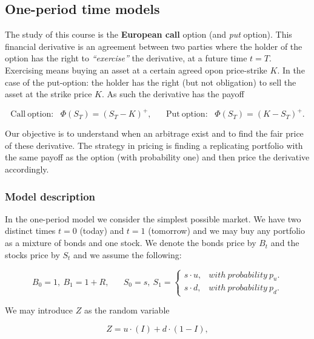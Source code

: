 \documentclass[
]{book}
\begin{document}
\hypertarget{one-period-time-models}{%
\subsection{One-period time models}\label{one-period-time-models}}

The study of this course is the \textbf{European call} option (and \emph{put} option). This financial derivative is an agreement between two parties where the holder of the option has the right to \emph{``exercise''} the derivative, at a future time \(t=T\). Exercising means buying an asset at a certain agreed opon price-strike \(K\). In the case of the put-option: the holder has the right (but not obligation) to sell the asset at the strike price \(K\). As such the derivative has the payoff

\[\text{Call}\ \text{option:}\hspace{10pt}\Phi(S_T)=(S_T-K)^+,\hspace{20pt}\text{Put}\ \text{option:}\hspace{10pt}\Phi(S_T)=(K-S_T)^+.\]

Our objective is to understand when an arbitrage exist and to find the fair price of these derivative. The strategy in pricing is finding a replicating portfolio with the same payoff as the option (with probability one) and then price the derivative accordingly.

\hypertarget{model-description}{%
\subsubsection{Model description}\label{model-description}}

In the one-period model we consider the simplest possible market. We have two distinct times \(t=0\) (today) and \(t=1\) (tomorrow) and we may buy any portfolio as a mixture of bonds and one stock. We denote the bonds price by \(B_t\) and the stocks price by \(S_t\) and we assume the following:

\[
B_0=1,\ B_1=1+R,\hspace{20pt}S_0=s,\ S_1=\left\{\begin{matrix}s\cdot u, & with\ probability\ p_u.\\s\cdot d, & with\ probability\ p_d.\end{matrix}\right.
\]

We may introduce \(Z\) as the random variable

\[
Z=u\cdot (I)+d\cdot (1-I),
\]
\end{document}
